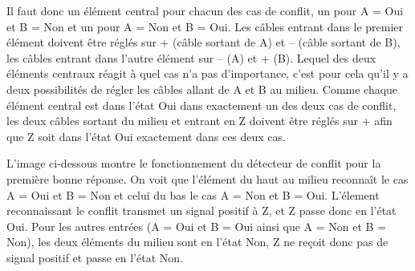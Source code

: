{{{\centering%
\par}

Il faut donc un élément central pour chacun des cas de conflit, un pour A = Oui et B = Non et un pour A = Non et B = Oui. Les câbles entrant dans le premier élément doivent être réglés sur + (câble sortant de A) et – (câble sortant de B), les câbles entrant dans l’autre élément sur – (A) et + (B). Lequel des deux éléments centraux réagit à quel cas n’a pas d’importance, c’est pour cela qu’il y a deux possibilités de régler les câbles allant de A et B au milieu. Comme chaque élément central est dans l’état Oui dans exactement un des deux cas de conflit, les deux câbles sortant du milieu et entrant en Z doivent être réglés sur + afin que Z soit dans l’état Oui exactement dans ces deux cas.

L’image ci-dessous montre le fonctionnement du détecteur de conflit pour la première bonne réponse. On voit que l’élément du haut au milieu reconnaît le cas A = Oui et B = Non et celui du bas le cas A = Non et B = Oui. L’élement reconnaissant le conflit transmet un signal positif à Z, et Z passe donc en l’état Oui. Pour les autres entrées (A = Oui et B = Oui ainsi que A = Non et B = Non), les deux éléments du milieu sont en l’état Non, Z ne reçoit donc pas de signal positif et passe en l’état Non.

{\centering%
\raisebox{-0.5ex}{} \raisebox{-0.5ex}{}

\raisebox{-0.5ex}{} \raisebox{-0.5ex}{}\par}



}}
